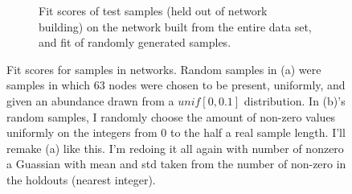 \documentclass[10pt]{article}
\theoremstyle{definition}
\numberwithin{theorem}{section}
\numberwithin{definition}{section}
\numberwithin{lemma}{section}
\numberwithin{corollary}{section}
\numberwithin{clm}{section}
\numberwithin{rmk}{section}
\begin{document}
\begin{figure}
\begin{subfigure}{\textwidth}
\begin{center}
	\end{center}
\caption{Fit scores of test samples (held out of network building) on the network built from the entire data set, and fit of randomly generated samples.}
\end{subfigure}
\caption{Fit scores for samples in networks. Random samples in (a) were samples in which 63 nodes were chosen to be present, uniformly, and given an abundance drawn from a $unif[0,0.1]$ distribution. In (b)'s random samples, I randomly choose the amount of non-zero values uniformly on the integers from 0 to the half a real sample length. I'll remake (a) like this. I'm redoing it all again with number of nonzero a Guassian with mean and std taken from the number of non-zero in the holdouts (nearest integer).}\label{fit_scores}
\end{figure}



\end{document}
